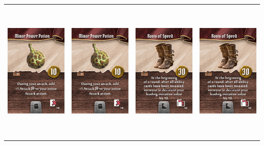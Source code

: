 \documentclass{minimal}
\begin{document}
{\begin{longtable}{llll}
\includegraphics[width=44mm,height=68mm]{./1-14/gh-014-minor-power-potion.png} &
\includegraphics[width=44mm,height=68mm]{./1-14/gh-014-minor-power-potion.png} &
\includegraphics[width=44mm,height=68mm]{./15-21/gh-015-boots-of-speed.png} &
\includegraphics[width=44mm,height=68mm]{./15-21/gh-015-boots-of-speed.png}\\ 

\end{longtable}}
\end{document}

